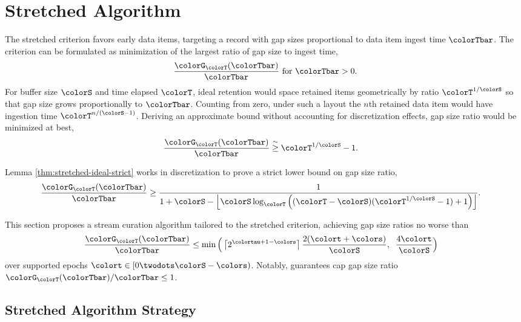 \section{Stretched Algorithm} \label{sec:stretched}

The stretched criterion favors early data items, targeting a record with gap sizes proportional to data item ingest time $\colorTbar$.
The criterion can be formulated as minimization of the largest ratio of gap size to ingest time,
\begin{align*}
\frac{\colorG_{\colorT}(\colorTbar)}{\colorTbar} \text{ for } \colorTbar > 0.
\end{align*}
For buffer size $\colorS$ and time elapsed $\colorT$, ideal retention would space retained items geometrically by ratio $\colorT^{1/\colorS}$ so that gap size grows proportionally to $\colorTbar$.
Counting from zero, under such a layout the $n$th retained data item would have ingestion time $\colorT^{n/(\colorS - 1)}$.
Deriving an approximate bound without accounting for discretization effects, gap size ratio would be minimized at best,
\begin{align}
\label{eqn:approx-gap-bound}
\frac{\colorG_{\colorT}(\colorTbar)}{\colorTbar}
&\stackrel{\sim}{\geq}
\colorT^{1/\colorS} - 1.
\end{align}

Lemma \ref{thm:stretched-ideal-strict} works in discretization to prove a strict lower bound on gap size ratio,
\begin{align*}
\frac{\colorG_{\colorT}(\colorTbar)}{\colorTbar}
&\geq
\frac{
  1
}{
  1 + \colorS
  - \left\lfloor \colorS \log_{\colorT}\Big(
    (\colorT - \colorS)(\colorT^{1/\colorS} - 1) + 1
  \Big)\right\rfloor
}.
\end{align*}

This section proposes a stream curation algorithm tailored to the stretched criterion, achieving gap size ratios no worse than
\begin{align*}
\frac{\colorG_{\colorT}(\colorTbar)}{\colorTbar}
&\leq
\min\Big(
  \left\lceil 2^{\colortau + 1 - \colors}\right\rceil
  \frac{2(\colort + \colors)}{\colorS},\;\;
  \frac{4\colort}{\colorS}
\Big)
\end{align*}
over supported epochs $\colort \in [0\twodots\colorS - \colors)$.
Notably, guarantees cap gap size ratio ${\colorG_{\colorT}(\colorTbar)}/{\colorTbar} \leq 1$.

\subsection{Stretched Algorithm Strategy}
\label{sec:stretched-strategy}

